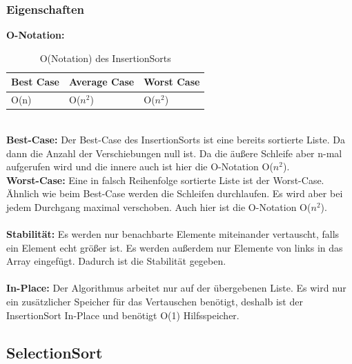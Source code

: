 \documentclass{article}
\begin{document}
\subsubsection{Eigenschaften}
\textbf{O-Notation:}
\begin{table}[h]
\centering
\begin{tabular}{lll}
	\hline
	\textbf{Best Case} & \textbf{Average Case} & \textbf{Worst Case} \\
	\hline
	O(n) & O($n^{2}$) & O($n^{2}$) \\
	\hline
\end{tabular}
\caption{O(Notation) des InsertionSorts \cite{India2015Dataset}}
\label{tab:InsertionSort}
\end{table}
\\
\textbf{Best-Case:} Der Best-Case des InsertionSorts ist eine bereits sortierte Liste. Da dann die Anzahl der Verschiebungen null ist. Da die äußere Schleife aber n-mal aufgerufen wird und die innere auch ist hier die O-Notation O($n^{2}$). \\
\textbf{Worst-Case:} Eine in falsch Reihenfolge sortierte Liste ist der Worst-Case. Ähnlich wie beim Best-Case werden die Schleifen durchlaufen. Es wird aber bei jedem Durchgang maximal verschoben. Auch hier ist die O-Notation O($n^{2}$).\\ \\
\textbf{Stabilität:}  Es werden nur benachbarte Elemente miteinander vertauscht, falls ein Element echt größer ist. Es werden außerdem nur Elemente von links in das Array eingefügt. Dadurch ist die Stabilität gegeben.\\ \\
\textbf{In-Place:}  Der Algorithmus arbeitet nur auf der übergebenen Liste. Es wird nur ein zusätzlicher Speicher für das Vertauschen benötigt, deshalb ist der InsertionSort In-Place und benötigt O(1) Hilfsspeicher. \cite{India2015Dataset}\\


\subsection{SelectionSort}
\end{document}
